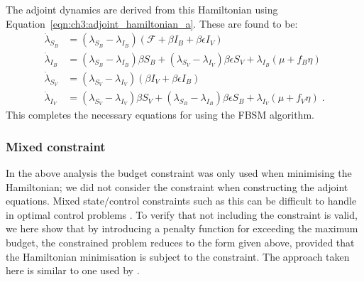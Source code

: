 The adjoint dynamics are derived from this Hamiltonian using Equation~\ref{eqn:ch3:adjoint_hamiltonian_a}. These are found to be:
\begin{subequations}\label{eqn:ch3:adjoint_dynamics}
    \begin{align}
    \dot{\lambda}_{S_B} &= \left(\lambda_{S_B} - \lambda_{I_B}\right)\left(\mathcal{F} + \beta{}I_B+\beta\epsilon{}I_V\right) \label{eqn:ch3:adjoint_dynamics_a} \\
    \dot{\lambda}_{I_B} &= \left(\lambda_{S_B} - \lambda_{I_B}\right)\beta{}S_B + \left(\lambda_{S_V} - \lambda_{I_V}\right)\beta\epsilon{}S_V + \lambda_{I_B}\left(\mu + f_B\eta\right) \label{eqn:ch3:adjoint_dynamics_b} \\
    \dot{\lambda}_{S_V} &= \left(\lambda_{S_V} - \lambda_{I_V}\right)\left(\beta{}I_V+\beta\epsilon{}I_B\right) \label{eqn:ch3:adjoint_dynamics_c} \\
    \dot{\lambda}_{I_V} &= \left(\lambda_{S_V} - \lambda_{I_V}\right)\beta{}S_V + \left(\lambda_{S_B} - \lambda_{I_B}\right)\beta\epsilon{}S_B + \lambda_{I_V}\left(\mu + f_V\eta\right)\;. \label{eqn:ch3:adjoint_dynamics_d}
    \end{align}
\end{subequations}
This completes the necessary equations for using the FBSM algorithm.

\subsubsection{Mixed constraint}

In the above analysis the budget constraint was only used when minimising the Hamiltonian; we did not consider the constraint when constructing the adjoint equations. Mixed state/control constraints such as this can be difficult to handle in optimal control problems \citep{hartl_survey_1995}. To verify that not including the constraint is valid, we here show that by introducing a penalty function for exceeding the maximum budget, the constrained problem reduces to the form given above, provided that the Hamiltonian minimisation is subject to the constraint. The approach taken here is similar to one used by \citet[Chapter 4]{sage_optimum_1968}.

